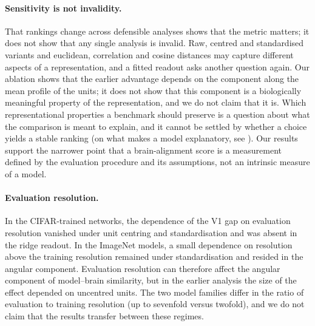 \paragraph{Sensitivity is not invalidity.}
That rankings change across defensible analyses shows that the metric matters; it does not show that any single analysis is invalid. Raw, centred and standardised variants and euclidean, correlation and cosine distances may capture different aspects of a representation, and a fitted readout asks another question again. Our ablation shows that the earlier advantage depends on the component along the mean profile of the units; it does not show that this component is a biologically meaningful property of the representation, and we do not claim that it is. Which representational properties a benchmark should preserve is a question about what the comparison is meant to explain, and it cannot be settled by whether a choice yields a stable ranking (on what makes a model explanatory, see \citealt{cao2024}). Our results support the narrower point that a brain-alignment score is a measurement defined by the evaluation procedure and its assumptions, not an intrinsic measure of a model.

\paragraph{Evaluation resolution.}
In the CIFAR-trained networks, the dependence of the V1 gap on evaluation resolution
vanished under unit centring and standardisation and was absent in the ridge readout.
In the ImageNet models, a small dependence on resolution above the training resolution
remained under standardisation and resided in the angular component. Evaluation
resolution can therefore affect the angular component of model--brain similarity, but
in the earlier analysis \citep{evalres} the size of the effect depended on uncentred units. The two model
families differ in the ratio of evaluation to training resolution (up to sevenfold versus
twofold), and we do not claim that the results transfer between these regimes.

